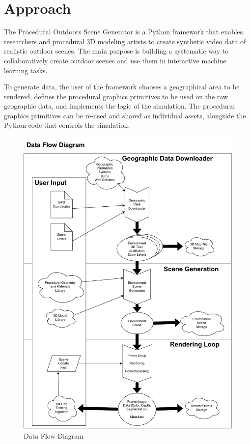 \chapter{Approach}
\label{chapter:approach}


The Procedural Outdoors Scene Generator is a Python framework that enables researchers and procedural 3D modeling artists to create synthetic video data of realistic outdoor scenes. The main purpose is building a systematic way to collaboratively create outdoor scenes and use them in interactive machine learning tasks.


To generate data, the user of the framework chooses a geographical area to be rendered, defines the procedural graphics primitives to be used on the raw geographic data, and implements the logic of the simulation. The procedural graphics primitives can be re-used and shared as individual assets, alongside the Python code that controls the simulation.


\begin{figure}[ht]
    \centering
    \includegraphics[width=14cm]{src/img/fig/fig-1-overview-v2.drawio-1.pdf}
    \caption{Data Flow Diagram}

    \label{fig:design-overview}
\end{figure}

